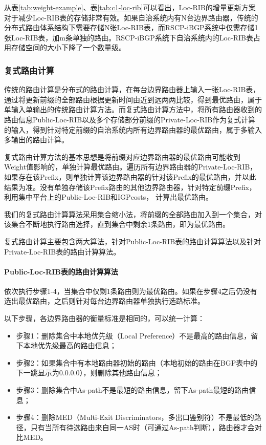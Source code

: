 从表\ref{tab:weight-example}、表\ref{tab:c1-loc-rib}可以看出，Loc-RIB的增量更新方案对于减少Loc-RIB表的存储非常有效。如果自治系统内有N台边界路由器，传统的分布式路由体系结构下需要存储N张Loc-RIB表，而RSCP-iBGP系统中仅需存储1张Loc-RIB表，加m条单独的路由。RSCP-iBGP系统下自治系统内的Loc-RIB表占用存储空间的大小下降了一个数量级。


\subsubsection{复式路由计算}

传统的路由计算是分布式的路由计算，在每台边界路由器上输入一张Loc-RIB表，通过将更新前缀的全部路由根据更新时间由近到远两两比较，得到最优路由，属于单输入单输出的传统路由计算方法。而复式路由计算方法中，将所有路由器收到的路由信息Public-Loc-RIB以及多个存储部分前缀的Private-Loc-RIB作为复式计算的输入，得到针对特定前缀的自治系统内所有边界路由器的最优路由，属于多输入多输出的路由计算。

复式路由计算方法的基本思想是将前缀对应边界路由器的最优路由可能收到Weight值影响的，单独计算最优路由。遍历所有边界路由器的Private-Loc-RIB，如果存在该Prefix，则单独计算该边界路由器的针对该Prefix的最优路由，并以此结果为准。没有单独存储该Prefix路由的其他边界路由器，针对特定前缀Prefix，利用集中平台上的Public-Loc-RIB和IGPcosts， 计算出最优路由。

我们的复式路由计算算法采用集合缩小法，将前缀的全部路由加入到一个集合，对该集合不断地执行路由选择，直到集合中剩余1条路由，即为最优路由。

复式路由计算主要包含两大算法，针对Public-Loc-RIB表的路由计算算法以及针对Private-Loc-RIB表的路由计算算法。

\paragraph{Public-Loc-RIB表的路由计算算法}依次执行步骤1-4，当集合中仅剩1条路由则为最优路由。如果在步骤4之后仍没有选出最优路由，之后则针对每台边界路由器单独执行选路标准。

以下步骤，各边界路由器的衡量标准是相同的，可以统一计算：
\begin{itemize}
    \item 步骤1：删除集合中本地优先级（Local Preference）不是最高的路由信息，留下本地优先级最高的路由信息；
    \item 步骤2：如果集合中有本地路由器初始的路由（本地初始的路由在BGP表中的下一跳显示为0.0.0.0），则删除其他路由信息；
    \item 步骤3：删除集合中As-path不是最短的路由信息，留下As-path最短的路由信息；
    \item 步骤4：删除MED（Multi-Exit Discriminators，多出口鉴别符）不是最低的路径，只有当所有待选路由来自同一AS时（可通过As-path判断），路由器才会对比MED。\\
\end{itemize}


